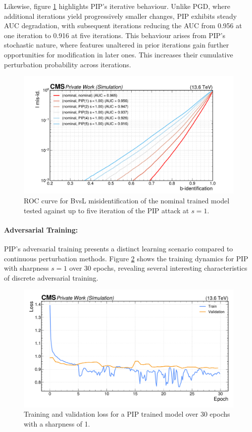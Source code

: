 Likewise, figure \ref{fig:intprob_rocs_vs_iterations} highlights PIP's iterative behaviour. Unlike PGD, where additional iterations yield progressively smaller changes, PIP exhibits steady AUC degradation, with subsequent iterations reducing the AUC from 0.956 at one iteration to 0.916 at five iterations. This behaviour arises from PIP's stochastic nature, where features unaltered in prior iterations gain further opportunities for modification in later ones. This increases their cumulative perturbation probability across iterations.


\begin{figure}[h]
\centering
    \includegraphics[width=15cm]{media/output/roc_bvsl_intprob_iterations.pdf}
    \caption{ROC curve for BvsL misidentification of the nominal trained model tested against up to five iteration of the PIP attack at $s=1$.}
    \label{fig:intprob_rocs_vs_iterations}
\end{figure}

\paragraph{Adversarial Training:} PIP's adversarial training presents a distinct learning scenario compared to continuous perturbation methods. 
Figure \ref{fig:intprob_training} shows the training dynamics for PIP with sharpness $s=1$ over 30 epochs, revealing several interesting characteristics of discrete adversarial training.

\begin{figure}[h]
\centering
    \includegraphics[width=15cm]{media/output/intprob_loss_validation.pdf}
    \caption{Training and validation loss for a PIP trained model over 30 epochs with a sharpness of 1.}
    \label{fig:intprob_training}
\end{figure}

